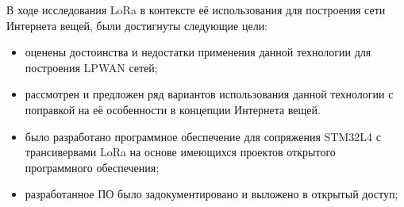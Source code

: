 \Conclusion %

В ходе исследования LoRa в контексте её использования для построения сети 
Интернета вещей, были достигнуты следующие цели:

\begin{itemize}
 \item оценены достоинства и недостатки применения данной технологии для 
построения LPWAN сетей;
 \item рассмотрен и предложен ряд вариантов использования данной технологии с 
поправкой на её особенности в концепции Интернета вещей.
 \item было разработано программное обеспечение для сопряжения STM32L4 с 
трансивервами LoRa на основе имеющихся проектов открытого программного 
обеспечения;
 \item разработанное ПО было задокументировано и выложено в открытый доступ;
\end{itemize}

